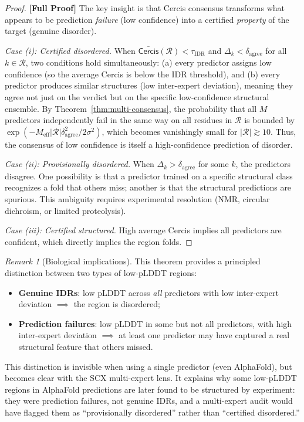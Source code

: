 \documentclass[12pt,a4paper]{article}
\theoremstyle{remark}
\newtheorem{remark}[theorem]{Remark}
\newcommand{\Cercis}{\textsf{Cercis}}
\newcommand{\rigorFull}{\textbf{[Full Proof]}}
\begin{document}
\begin{proof}
\rigorFull
The key insight is that Cercis consensus transforms what appears to be prediction \emph{failure} (low confidence) into a certified \emph{property} of the target (genuine disorder).

\medskip\noindent\textit{Case (i): Certified disordered.}
When $\bar{\Cercis}(\mathcal{R}) < \tau_{\text{IDR}}$ and $\Delta_k < \delta_{\text{agree}}$ for all $k \in \mathcal{R}$, two conditions hold simultaneously:
(a) every predictor assigns low confidence (so the average Cercis is below the IDR threshold), and
(b) every predictor produces similar structures (low inter-expert deviation), meaning they agree not just on the verdict but on the specific low-confidence structural ensemble.
By Theorem~\ref{thm:multi-consensus}, the probability that all $M$ predictors independently fail in the same way on all residues in $\mathcal{R}$ is bounded by $\exp(-M_{\text{eff}} |\mathcal{R}| \delta_{\text{agree}}^2 / 2\sigma^2)$, which becomes vanishingly small for $|\mathcal{R}| \gtrsim 10$.
Thus, the consensus of low confidence is itself a high-confidence prediction of disorder.

\medskip\noindent\textit{Case (ii): Provisionally disordered.}
When $\Delta_k > \delta_{\text{agree}}$ for some $k$, the predictors disagree.
One possibility is that a predictor trained on a specific structural class recognizes a fold that others miss; another is that the structural predictions are spurious.
This ambiguity requires experimental resolution (NMR, circular dichroism, or limited proteolysis).

\medskip\noindent\textit{Case (iii): Certified structured.}
High average Cercis implies all predictors are confident, which directly implies the region folds.
\end{proof}

\begin{remark}[Biological implications]
This theorem provides a principled distinction between two types of low-pLDDT regions:
\begin{itemize}[leftmargin=*]
    \item \textbf{Genuine IDRs}: low pLDDT across \emph{all} predictors with low inter-expert deviation $\implies$ the region is disordered;
    \item \textbf{Prediction failures}: low pLDDT in some but not all predictors, with high inter-expert deviation $\implies$ at least one predictor may have captured a real structural feature that others missed.
\end{itemize}
This distinction is invisible when using a single predictor (even AlphaFold), but becomes clear with the SCX multi-expert lens.
It explains why some low-pLDDT regions in AlphaFold predictions are later found to be structured by experiment: they were prediction failures, not genuine IDRs, and a multi-expert audit would have flagged them as ``provisionally disordered'' rather than ``certified disordered.''
\end{remark}
\end{document}
